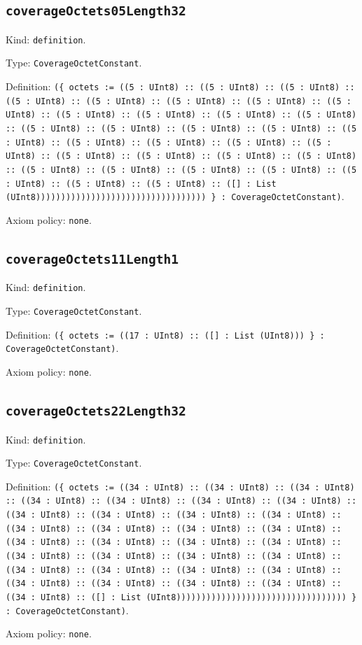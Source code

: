 \documentclass[11pt]{article}
\begin{document}
\subsection*{\texttt{coverageOctets05Length32}}
\noindent Kind: \texttt{definition}.\par
\noindent Type: \texttt{CoverageOctetConstant}.\par
\noindent Definition: \texttt{(\{ octets := ((5 : UInt8) :: ((5 : UInt8) :: ((5 : UInt8) :: ((5 : UInt8) :: ((5 : UInt8) :: ((5 : UInt8) :: ((5 : UInt8) :: ((5 : UInt8) :: ((5 : UInt8) :: ((5 : UInt8) :: ((5 : UInt8) :: ((5 : UInt8) :: ((5 : UInt8) :: ((5 : UInt8) :: ((5 : UInt8) :: ((5 : UInt8) :: ((5 : UInt8) :: ((5 : UInt8) :: ((5 : UInt8) :: ((5 : UInt8) :: ((5 : UInt8) :: ((5 : UInt8) :: ((5 : UInt8) :: ((5 : UInt8) :: ((5 : UInt8) :: ((5 : UInt8) :: ((5 : UInt8) :: ((5 : UInt8) :: ((5 : UInt8) :: ((5 : UInt8) :: ((5 : UInt8) :: ((5 : UInt8) :: ([] : List (UInt8)))))))))))))))))))))))))))))))))) \} : CoverageOctetConstant)}.\par
\noindent Axiom policy: \texttt{none}.\par
\subsection*{\texttt{coverageOctets11Length1}}
\noindent Kind: \texttt{definition}.\par
\noindent Type: \texttt{CoverageOctetConstant}.\par
\noindent Definition: \texttt{(\{ octets := ((17 : UInt8) :: ([] : List (UInt8))) \} : CoverageOctetConstant)}.\par
\noindent Axiom policy: \texttt{none}.\par
\subsection*{\texttt{coverageOctets22Length32}}
\noindent Kind: \texttt{definition}.\par
\noindent Type: \texttt{CoverageOctetConstant}.\par
\noindent Definition: \texttt{(\{ octets := ((34 : UInt8) :: ((34 : UInt8) :: ((34 : UInt8) :: ((34 : UInt8) :: ((34 : UInt8) :: ((34 : UInt8) :: ((34 : UInt8) :: ((34 : UInt8) :: ((34 : UInt8) :: ((34 : UInt8) :: ((34 : UInt8) :: ((34 : UInt8) :: ((34 : UInt8) :: ((34 : UInt8) :: ((34 : UInt8) :: ((34 : UInt8) :: ((34 : UInt8) :: ((34 : UInt8) :: ((34 : UInt8) :: ((34 : UInt8) :: ((34 : UInt8) :: ((34 : UInt8) :: ((34 : UInt8) :: ((34 : UInt8) :: ((34 : UInt8) :: ((34 : UInt8) :: ((34 : UInt8) :: ((34 : UInt8) :: ((34 : UInt8) :: ((34 : UInt8) :: ((34 : UInt8) :: ((34 : UInt8) :: ([] : List (UInt8)))))))))))))))))))))))))))))))))) \} : CoverageOctetConstant)}.\par
\noindent Axiom policy: \texttt{none}.\par
\end{document}

